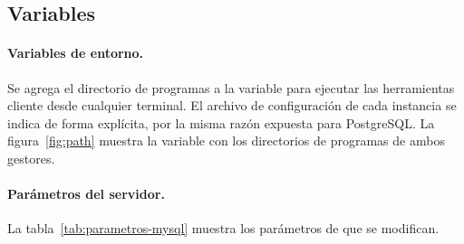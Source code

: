 \subsection{Variables}

\paragraph{Variables de entorno.} Se agrega el directorio de programas a la variable  para ejecutar las herramientas cliente desde cualquier terminal. El archivo de configuración de cada instancia se indica de forma explícita, por la misma razón expuesta para PostgreSQL. La figura~\ref{fig:path} muestra la variable  con los directorios de programas de ambos gestores.


\paragraph{Parámetros del servidor.} La tabla~\ref{tab:parametros-mysql} muestra los parámetros de  que se modifican.

